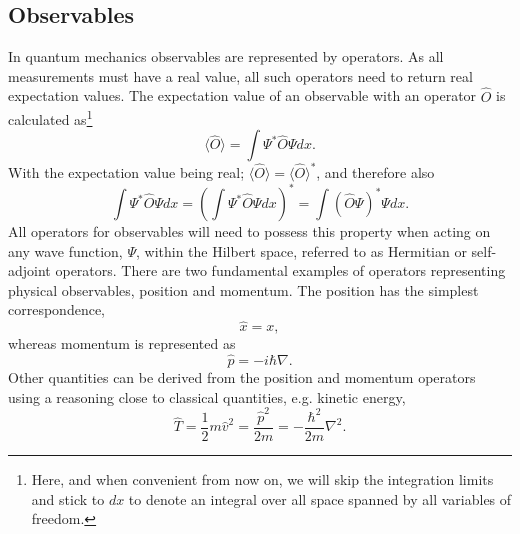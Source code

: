 \subsection{Observables}

In quantum mechanics observables are represented by operators.
As all measurements must have a real value, all such operators need to return real expectation values.
The expectation value of an observable with an operator $\hat{O}$ is calculated
as\footnote{Here, and when convenient from now on, we will skip the integration 
limits and stick to $dx$ to denote an integral over all space 
spanned by all variables of freedom.}
\begin{equation}
\label{eq:qm:expectation}
\langle \hat{O} \rangle = \int \Psi^{*} \hat{O} \Psi dx .
\end{equation}
With the expectation value being real; 
$\langle \hat{O} \rangle = \langle \hat{O} \rangle^{*}$, and therefore also
\begin{equation}
\label{eq:qm:hermitian}
\int \Psi^{*} \hat{O} \Psi dx 
= \left(\int \Psi^{*} \hat{O} \Psi dx\right)^{*}
= \int \left(\hat{O} \Psi\right)^{*} \Psi dx .
\end{equation}
All operators for observables will need to possess this property when acting on any wave function, $\Psi$, within the Hilbert space, referred to as Hermitian or self-adjoint operators.
There are two fundamental examples of operators representing physical observables, position and momentum. 
The position has the simplest correspondence,
\begin{equation}
\label{eq:qm:operX}
\hat{x} = x,
\end{equation}
whereas momentum is represented as
\begin{equation}
\hat{p} = - i \hbar \nabla .
\end{equation}
Other quantities can be derived from the position and momentum operators using a
reasoning close to classical quantities, e.g. kinetic energy,
\begin{equation}
\hat{T} = \frac{1}{2} m \hat{v}^2 = \frac{\hat{p}^2}{2m} = - \frac{\hbar^2}{2m} \nabla^2 .
\end{equation}


